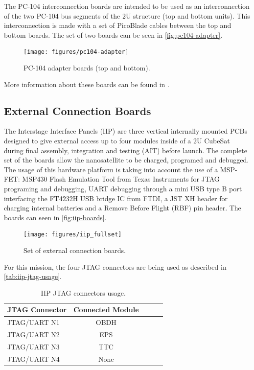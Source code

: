 The PC-104 interconnection boards are intended to be used as an interconnection of the two PC-104 bus segments of the 2U structure (top and bottom units). This interconnection is made with a set of PicoBlade cables between the top and bottom boards. The set of two boards can be seen in \autoref{fig:pc104-adapter}.

\begin{figure}[!ht]
    \begin{center}
        \texttt{[image: figures/pc104-adapter]}
        \caption{PC-104 adapter boards (top and bottom).}
        \label{fig:pc104-adapter}
    \end{center}
\end{figure}

More information about these boards can be found in \cite{pc104-boards}.

\subsection{External Connection Boards}

The Interstage Interface Panels (IIP) are three vertical internally mounted PCBs designed to give external access up to four modules inside of a 2U CubeSat during final assembly, integration and testing (AIT) before launch. The complete set of the boards allow the nanosatellite to be charged, programed and debugged. The usage of this hardware platform is taking into account the use of a MSP-FET: MSP430 Flash Emulation Tool from Texas Instruments for JTAG programing and debugging, UART debugging through a mini USB type B port interfacing the FT4232H USB bridge IC from FTDI, a JST XH header for charging internal batteries and a Remove Before Flight (RBF) pin header. The boards can seen in \autoref{fig:iip-boards}.

\begin{figure}[!ht]
    \begin{center}
        \texttt{[image: figures/iip\_fullset]}
        \caption{Set of external connection boards.}
        \label{fig:iip-boards}
    \end{center}
\end{figure}

For this mission, the four JTAG connectors are being used as described in \autoref{tab:iip-jtag-usage}.

\begin{table}[!h]
    \centering
    \begin{tabular}{lcccc}
        \toprule[1.5pt]
        \textbf{JTAG Connector} & \textbf{Connected Module} \\
        \midrule
        JTAG/UART N1 & OBDH \\
        JTAG/UART N2 & EPS \\
        JTAG/UART N3 & TTC \\
        JTAG/UART N4 & None \\
        \bottomrule[1.5pt]
    \end{tabular}
    \caption{IIP JTAG connectors usage.}
    \label{tab:iip-jtag-usage}
\end{table}

